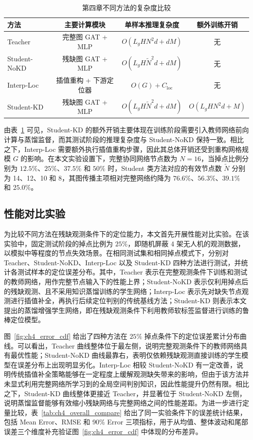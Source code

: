 \begin{table}[H]
    \centering
    \caption{第四章不同方法的复杂度比较}
    \label{tab:ch4_complexity_compare}
    \begin{tabular}{lccc}
        \toprule
        \textbf{方法} & \textbf{主要计算模块} & \textbf{单样本推理复杂度} & \textbf{额外训练开销} \\
        \midrule
        Teacher & 完整图 GAT + MLP & \(O(L_gHN^{2}d+dM)\) & 无 \\
        Student-NoKD & 残缺图 GAT + MLP & \(O(L_gH\tilde{N}^{2}d+dM)\) & 无 \\
        Interp-Loc & 插值重构 + 下游定位器 & \(O(G)+C_{\mathrm{loc}}\) & 无 \\
        Student-KD & 残缺图 GAT + MLP & \(O(L_gH\tilde{N}^{2}d+dM)\) & \(O(L_gHN^{2}d+M)\) \\
        \bottomrule
    \end{tabular}
\end{table}

由表~\ref{tab:ch4_complexity_compare} 可见，Student-KD 的额外开销主要体现在训练阶段需要引入教师网络前向计算与蒸馏监督，而其测试阶段的推理复杂度与 Student-NoKD 保持一致。相比之下，Interp-Loc 需要额外执行插值重构步骤，因此其总体开销还受到重构网格规模 \(G\) 的影响。在本文实验设置下，完整协同网络节点数为 \(N=16\)，当掉点比例分别为 \(12.5\%\)、\(25\%\)、\(37.5\%\) 和 \(50\%\) 时，Student 类方法对应的有效节点数 \(\tilde{N}\) 分别为 14、12、10 和 8，其图传播主项相对完整网络约降为 \(76.6\%\)、\(56.3\%\)、\(39.1\%\) 和 \(25.0\%\)。

\subsection{性能对比实验}
\label{subsec:4_4_2}

为比较不同方法在残缺观测条件下的定位能力，本文首先开展性能对比实验。在该实验中，固定测试阶段的掉点比例为 \(25\%\)，即随机屏蔽 4 架无人机的观测数据，以模拟中等程度的节点失效场景。在相同测试集和相同掉点模式下，分别对 Teacher、Student-NoKD、Interp-Loc 以及 Student-KD 四种方法进行测试，并统计各测试样本的定位误差分布。其中，Teacher 表示在完整观测条件下训练和测试的教师网络，用作完整节点输入下的性能上界；Student-NoKD 表示仅利用掉点后的残缺观测、且不采用知识蒸馏训练的学生网络；Interp-Loc 表示先对缺失节点观测进行插值补全，再执行后续定位判别的传统基线方法；Student-KD 则表示本文提出的蒸馏增强学生网络，即在残缺观测条件下利用教师软标签监督进行训练的鲁棒定位模型。

图~\ref{fig:ch4_error_cdf} 给出了四种方法在 \(25\%\) 掉点条件下的定位误差累计分布曲线。可以看出，Teacher 曲线整体位于最左侧，说明完整观测条件下的教师网络具有最优性能；Student-NoKD 曲线最靠右，表明仅依赖残缺观测直接训练的学生模型在误差分布上出现明显劣化。Interp-Loc 相较 Student-NoKD 有一定改善，说明传统插值补全策略能够在一定程度上缓解观测缺失带来的影响，但由于该方法并未显式利用完整网络所学习到的全局空间判别知识，因此性能提升仍然有限。相比之下，Student-KD 曲线整体更接近 Teacher，并显著位于 Student-NoKD 左侧，说明蒸馏监督能够有效缩小残缺网络与完整网络之间的性能差距。为进一步进行定量比较，表~\ref{tab:ch4_overall_compare} 给出了同一实验条件下的误差统计结果，包括 Mean Error、RMSE 和 90\% Error 三项指标，用于从均值、整体波动和尾部误差三个维度补充验证图~\ref{fig:ch4_error_cdf} 中体现的分布差异。

